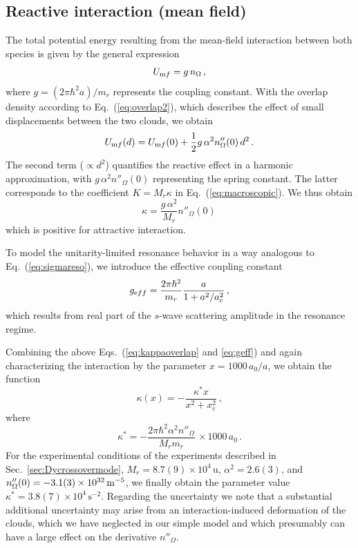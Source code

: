 \subsection{Reactive interaction (mean field)}
\label{app:kappa}

The total potential energy resulting from the mean-field interaction between both species is given by the general expression
\begin{equation}
	U_{\textrm mf} = g\,n_{\Omega} \, ,
\end{equation}
where $g = (2 \pi \hbar^2 a)/m_r$ represents the coupling constant.
With the overlap density according to Eq.~(\ref{eq:overlap2}), which
describes the effect of small displacements between the two clouds, we obtain
\begin{equation}
	U_{\textrm mf}(d) = U_{\textrm mf}(0) + \frac{1}{2} g \, \alpha^2 n''_{\Omega}(0) \, d^2 \, .
\end{equation}
The second term ($\propto d^2$) quantifies the reactive effect in a harmonic approximation, with $g\, \alpha^2 n''_{\Omega}(0)$ representing the spring constant. The latter corresponds to the coefficient $K = M_r \kappa$ in Eq.~(\ref{eq:macroscopic}). We thus obtain
\begin{equation}
	\kappa = \frac{g\, \alpha^2}{M_r}  n''_{\Omega}(0) \,
	\label{eq:kappaoverlap}
\end{equation}
which is positive for attractive interaction.

To model the unitarity-limited resonance behavior in a way analogous to Eq.~(\ref{eq:sigmareso}), we introduce the effective coupling constant
\begin{equation}
	g_{\textrm eff} = \frac{2 \pi \hbar^2}{m_r} \frac{a}{1+a^2/a_c^2} \, ,
	\label{eq:geff}
\end{equation}
which results from real part of the $s$-wave scattering amplitude in the resonance regime.

Combining the above Eqs.~(\ref{eq:kappaoverlap} and \ref{eq:geff}) and again characterizing the interaction by the parameter $x = 1000\,a_0/a$, we obtain the function
\begin{equation}
	\kappa(x) = -\frac{\kappa^* x}{x^2 + x_c^2} \, ,
\end{equation} 
where
\begin{equation}\label{eq:kappastar}
	\kappa^* = - \frac{2\pi\hbar^2 \alpha^2 n''_{\Omega} }{M_r m_r} \,  \times 1000\,a_0 \, .
\end{equation}
For the experimental conditions of the experiments described in Sec.~\ref{sec:Dycrossovermode}, 
$M_r = 8.7(9) \times 10^4\,\textrm{u}$,
$\alpha^2 = 2.6(3)$, and 
$n''_{\Omega}(0) = -3.1(3) \times 10^{32}\,{\textrm m}^{-5}$, 
we finally obtain the parameter value
$\kappa^* = 3.8(7)\times10^4\,\textrm{s}^{-2}$.
Regarding the uncertainty we note that a substantial additional  uncertainty may arise from an interaction-induced deformation of the clouds, which we have neglected in our simple model and which presumably can have a large effect on the derivative $n''_{\Omega}$.


